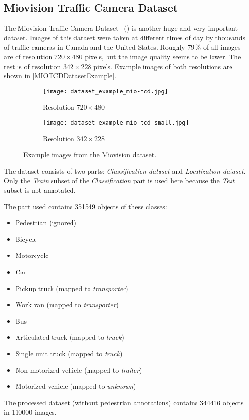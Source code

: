 \subsection{Miovision Traffic Camera Dataset}

The Miovision Traffic Camera Dataset~\cite{MIO2018} () is another huge and very important dataset. Images of this dataset
were taken at different times of day by thousands of traffic cameras in Canada
and the United States. Roughly $79\,\%$ of all images are of resolution $720
\times 480$ pixels, but the image quality seems to be lower. The rest is of
resolution $342 \times 228$ pixels. Example images of both resolutions are shown
in \autoref{MIOTCDDatasetExample}.

\begin{figure}[h]
    \centering
    \begin{subfigure}[b]{0.475\textwidth}
        \texttt{[image: dataset\_example\_mio-tcd.jpg]}
        \caption{Resolution $720 \times 480$}
    \end{subfigure}
    \begin{subfigure}[b]{0.475\textwidth}
        \texttt{[image: dataset\_example\_mio-tcd\_small.jpg]}
        \caption{Resolution $342 \times 228$}
    \end{subfigure}
    \caption{Example images from the Miovision dataset.}
    \label{MIOTCDDatasetExample}
\end{figure}

The dataset consists of two parts: \textit{Classification dataset} and
\textit{Localization dataset}. Only the \textit{Train} subset of the
\textit{Classification} part is used here because the \textit{Test} subset is
not annotated.

The part used contains \num{351549} objects of these classes:
\begin{itemize}
    \item Pedestrian (ignored)
    \item Bicycle
    \item Motorcycle
    \item Car
    \item Pickup truck (mapped to \textit{transporter})
    \item Work van (mapped to \textit{transporter})
    \item Bus
    \item Articulated truck (mapped to \textit{truck})
    \item Single unit truck (mapped to \textit{truck})
    \item Non-motorized vehicle (mapped to \textit{trailer})
    \item Motorized vehicle (mapped to \textit{unknown})
\end{itemize}
The processed dataset (without pedestrian annotations) contains \num{344416}
objects in \num{110000} images.

